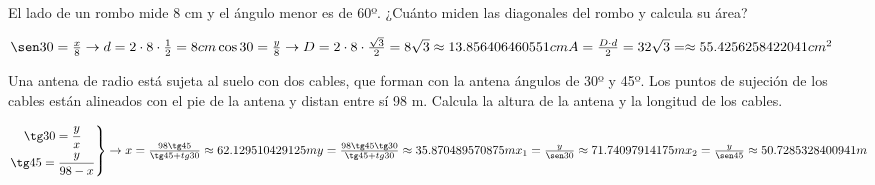 \documentclass[addpoints,spanish, 12pt,a4paper]{exam}
\begin{document}
\begin{questions}
\addpoints


\question[2]  El lado de un rombo mide
8 cm y el ángulo menor es de 60º. ¿Cuánto miden
las diagonales del rombo y calcula su área?
\begin{solution} $\sen 30 = \frac{x}{8} \to d=2\cdot8\cdot\frac{1}{2}=8 cm \\
\cos 30 = \frac{y}{8} \to D=2\cdot8\cdot\frac{\sqrt{3}}{2}=8\sqrt{3}\approx13.856406460551 cm \\
A=\frac{D\cdot d}{2}=32\sqrt{3}=\approx55.4256258422041 cm^2$ \end{solution}

\question[2]   Una antena de radio está sujeta al suelo con dos cables, que forman con la antena ángulos de 30º y 45º. Los puntos de sujeción de los cables están alineados  con el pie de la antena  y distan entre sí 98 m.
Calcula la altura de la antena y la longitud de los cables.
\begin{solution} $\left. \begin{gathered}
	  \tg 30 = \frac{y}{x} \\
	  \tg 45 = \frac{y}{98-x} \hfill
	 \end{gathered}  \right\rbrace \to \\
	 x=\frac{98\tg45}{\tg45+tg30}\approx62.129510429125 m\\
	 y=\frac{98\tg45\tg30}{\tg45+tg30}\approx35.870489570875 m\\
	 x_1=\frac{y}{\sen30}\approx71.74097914175 m \\
	 x_2=\frac{y}{\sen45}\approx50.7285328400941m$\end{solution}


\end{questions}
\end{document}
